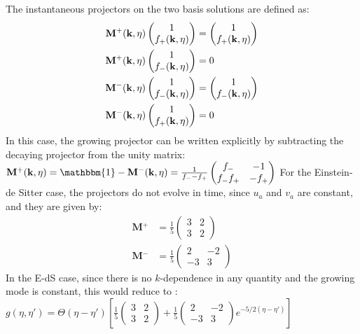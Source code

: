 The instantaneous projectors on the two basis solutions are defined
as:
\begin{align*}
\mathrm{\mathbf{M}}{}^{+}(\mathbf{k},\eta)\begin{pmatrix}1\\
f_{+}(\mathbf{k},\eta)
\end{pmatrix} & =\begin{pmatrix}1\\
f_{+}(\mathbf{k},\eta)
\end{pmatrix}\\
\mathrm{\mathbf{M}}{}^{+}(\mathbf{k},\eta)\begin{pmatrix}1\\
f_{-}(\mathbf{k},\eta)
\end{pmatrix} & =0\\
\mathbf{\mathrm{\mathbf{M}}}^{-}(\mathbf{k},\eta)\begin{pmatrix}1\\
f_{-}(\mathbf{k},\eta)
\end{pmatrix} & =\begin{pmatrix}1\\
f_{-}(\mathbf{k},\eta)
\end{pmatrix}\\
\mathrm{\mathbf{M}}^{-}(\mathbf{k},\eta)\begin{pmatrix}1\\
f_{+}(\mathbf{k},\eta)
\end{pmatrix} & =0
\end{align*}
In this case, the growing projector can be written explicitly by subtracting the
decaying projector from the unity matrix:
\beeqp$ 
\mathrm{\mathbf{M}}{}^{+}\pkn=\mathbbm{1}-\mathrm{\mathbf{M}}{}^{-}\pkn=\frac{1}{f_{-}-f_{+}}\begin{pmatrix}f_{-} & -1\\
f_{-}f_{+} & -f_{+}
\end{pmatrix}
$
For the Einstein-de Sitter case, the projectors do not evolve in time,
since $u_{a}$ and $v_{a}$ are constant, and they are given by: 
\begin{align*}
\mathrm{\mathbf{M}}{}^{+} & =\frac{1}{5}\begin{pmatrix}3 & 2\\
3 & 2
\end{pmatrix}\\
\mathrm{\mathbf{M}}{}^{-} & =\frac{1}{5}\begin{pmatrix}2 & -2\\
-3 & 3
\end{pmatrix}
\end{align*}
In the E-dS case, since there is no $k$-dependence
in any quantity and the growing mode is constant, this would reduce to :
\beeqp$ 
g(\eta,\eta')=\Theta(\eta-\eta')\left[\frac{1}{5}\begin{pmatrix}3 & 2\\
3 & 2
\end{pmatrix}+\frac{1}{5}\begin{pmatrix}2 & -2\\
-3 & 3
\end{pmatrix}e^{-5/2(\eta-\eta')}\right]
$


